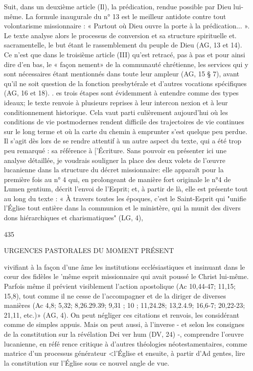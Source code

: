 Suit, dans un deuxième article (Il), la prédication, rendue possible par Dieu lui-même. La formule inaugurale du n° 13 est le meilleur antidote contre tout volontarisme missionnaire :
« Partout où Dieu ouvre la porte à la prédication... ». Le texte
analyse alors le processus de conversion et sa structure spirituelle et. sacramentelle, le but étant le rassemblement du peuple de Dieu (AG, 13 et 14). Ce n'est que dans le troisième article (III) qu'est retracé, pas à pas et pour ainsi dire d'en bas, le « façon­ nement» de la communauté chrétienne, les services qui y sont nécessaires étant mentionnés dans toute leur ampleur (AG, 15
§ 7), avant qu'il ne soit question de la fonction presbytérale et d'autres vocations spécifiques (AG, 16 et 18).
.  es trois étapes sont évidemment à entendre comme des types ideaux; le texte renvoie à plusieurs reprises à leur intercon­ nexion et à leur conditionnement historique. Cela vaut parti­ culièrement aujourd'hui où les conditions de vie postmodernes rendent difficile des trajectoires de vie continues sur le long terme et où la carte du chemin à emprunter s'est quelque peu perdue. Il s'agit dès lors de se rendre attentif à un autre aspect du texte, qui a été trop peu remarqué : sa référence à ['Écriture. Sans pouvoir en présenter ici une analyse détaillée, je voudrais souligner la place des deux volets de l'œuvre lucanienne dans la structure du décret missionnaire: elle apparaît pour la première fois au n° 4 qui, en prolongeant de manière fort originale le n°4 de Lumen gentium, décrit l'envoi de l'Esprit; et, à partir de là, elle est présente tout au long du texte :
« À travers toutes les époques, c'est le Saint-Esprit qui "unifie l'Église tout entière dans la communion et le ministère, qui la munit des divers dons hiérarchiques et charismatiques" (LG, 4),

435
 
URGENCES PASTORALES DU MOMENT PRÉSENT

vivifiant à la façon d'une âme les institutions ecclésiastiques et insinuant dans le cœur des fidèles le 'même esprit missionnaire qui avait poussé le Christ lui-même. Parfois même il prévient visiblement l'action apostolique (Ac 10,44-47; 11,15; 15,8), tout comme il ne cesse de l'accompagner et de la diriger de diverses manières (Ac 4,8; 5,32; 8,26.29.39; 9,31 ; 10 ; 11,24.28;
13,2.4.9; 16,6-7; 20,22-23; 21,11, etc.)» (AG, 4).
On peut négliger ces citations et renvois, les considérant comme de simples appuis. Mais on peut aussi, à l'inverse - et selon les consignes de la constitution sur la révélation Dei ver­ hum (DV, 24) -, comprendre l'œuvre lucanienne, en réfé­ rence critique à d'autres théologies néotestamentaires, comme matrice d'un processus générateur <l'Église et ensuite, à partir d'Ad gentes, lire la constitution sur l'Église sous ce nouvel angle
de vue.


